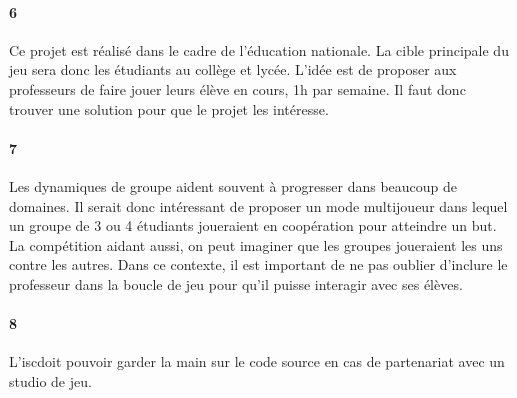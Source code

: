 \paragraph{6}Ce projet est réalisé dans le cadre de l'éducation nationale. La cible principale du jeu sera donc les étudiants au collège et lycée. L'idée est de proposer aux professeurs de
faire jouer leurs élève en cours, 1h par semaine. Il faut donc trouver une solution pour que le projet les intéresse.
\paragraph{7}Les dynamiques de groupe aident souvent à progresser dans beaucoup de domaines. Il serait donc intéressant de proposer un mode multijoueur dans lequel un groupe de 3 ou 4
étudiants joueraient en coopération pour atteindre un but. La compétition aidant aussi, on peut imaginer que les groupes joueraient les uns contre les autres. Dans ce contexte, il est
important de ne pas oublier d'inclure le professeur dans la boucle de jeu pour qu'il puisse interagir avec ses élèves.
\paragraph{8}L'\gls{isc}doit pouvoir garder la main sur le code source en cas de partenariat avec un studio de jeu.